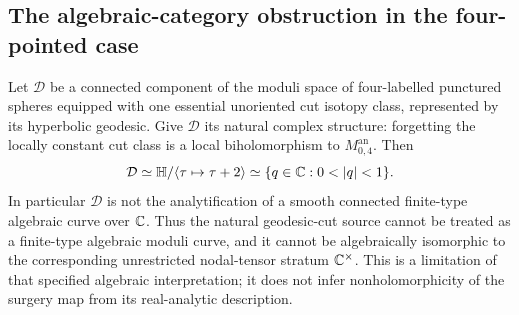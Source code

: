 \subsection{The algebraic-category obstruction in the four-pointed case}

\begin{proposition}
\label{A1-cut-not-algebraic}
Let $\mathcal D$ be a connected component of the moduli space of
four-labelled punctured spheres equipped with one essential
unoriented cut isotopy class, represented by its hyperbolic
geodesic. Give $\mathcal D$ its natural complex structure: forgetting
the locally constant cut class is a local biholomorphism to
$M_{0,4}^{\mathrm{an}}$.
Then
\[
 \mathcal D\simeq
 \mathbb H/\langle\tau\mapsto\tau+2\rangle
 \simeq\{q\in\C:0<|q|<1\}.
\]
In particular $\mathcal D$ is not the analytification of a smooth
connected finite-type algebraic curve over ${\mathbb{C}}$. Thus the natural
geodesic-cut source cannot be treated as a finite-type algebraic
moduli curve, and it cannot be algebraically isomorphic to the
corresponding unrestricted nodal-tensor stratum ${\mathbb{C}}^\times$.
This is a limitation of that specified algebraic interpretation;
it does not infer nonholomorphicity of the surgery map from its
real-analytic description.
\end{proposition}
